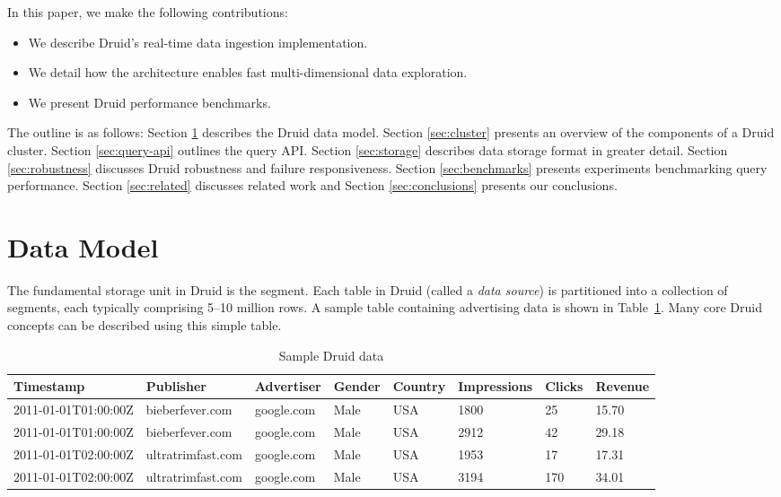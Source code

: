 \documentclass{vldb}
\begin{document}
In this paper, we make the following contributions:
\begin{itemize}
\item We describe Druid’s real-time data ingestion implementation.
\item We detail how the architecture enables fast multi-dimensional data exploration.
\item We present Druid performance benchmarks.
\end{itemize} 

The outline is as follows: Section \ref{sec:data-model} describes the Druid data model. Section \ref{sec:cluster} presents an overview of the components of a Druid cluster. Section \ref{sec:query-api} outlines the query API. Section \ref{sec:storage} describes data storage format in greater detail. Section \ref{sec:robustness} discusses Druid robustness and failure responsiveness. Section \ref{sec:benchmarks} presents experiments benchmarking query performance. Section \ref{sec:related} discusses related work and Section \ref{sec:conclusions} presents our conclusions.

\section{Data Model}
\label{sec:data-model}
The fundamental storage unit in Druid is the segment. Each table in Druid (called a \emph{data source})
is partitioned into a collection of segments, each typically comprising 5--10 million rows. A sample table 
containing advertising data is shown in Table~\ref{tab:sample_data}. Many core Druid concepts can be described
using this simple table.

\begin{table}
  \centering
  \caption{Sample Druid data}
  \label{tab:sample_data}
  \begin{tabular}{| l | l | l | l | l | l | l | l |}
    \hline
    \textbf{Timestamp} & \textbf{Publisher} & \textbf{Advertiser} & \textbf{Gender} & \textbf{Country} & \textbf{Impressions} & \textbf{Clicks} & \textbf{Revenue} \\ \hline
    2011-01-01T01:00:00Z & bieberfever.com & google.com & Male & USA & 1800 & 25 & 15.70 \\ \hline
    2011-01-01T01:00:00Z & bieberfever.com & google.com & Male & USA & 2912 & 42 & 29.18 \\ \hline
    2011-01-01T02:00:00Z & ultratrimfast.com & google.com & Male & USA & 1953 & 17 & 17.31 \\ \hline
    2011-01-01T02:00:00Z & ultratrimfast.com & google.com & Male & USA & 3194 & 170 & 34.01 \\ \hline
  \end{tabular}
\end{table}
\end{document}
